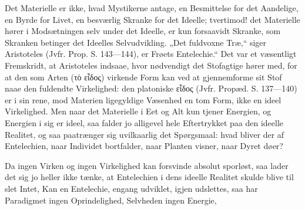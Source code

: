 \documentclass[12pt,a4paper]{book}
\begin{document}
Det Materielle er ikke, hvad Mystikerne antage, en Besmittelse for det
Aandelige, en Byrde for Livet, en besværlig Skranke for det Ideelle;
tvertimod! det Materielle hører i Modsætningen selv under det Ideelle, er
kun forsaavidt Skranke, som Skranken betinger det Ideelles Selvudvikling.
„Det fuldvoxne Træ,“ siger Aristoteles (Jvfr. Prop. S. 143---144), er
Frøets Entelechie.“
Det var et væsentligt Fremskridt, at Aristoteles indsaae, hvor nødvendigt
det Stofagtige hører med, for at den som Arten (τὸ εἶδος) virkende Form
kan ved at gjennemforme sit Stof naae den fuldendte Virkelighed: den
platoniske εἶδος (Jvfr. Propæd. S. 137---140) er i sin rene, mod Materien
ligegyldige Væsenhed en tom Form, ikke en ideel Virkelighed. Men naar det
Materielle i Eet og Alt kun tjener Energien, og Energien i sig er ideel,
saa falder jo alligevel hele Eftertrykket paa den ideelle Realitet, og saa
paatrænger sig uvilkaarlig det Spørgsmaal: hvad bliver der af Entelechien,
naar Individet bortfalder, naar Planten visner, naar Dyret døer?

Da ingen Virken og ingen Virkelighed kan forsvinde absolut sporløst, saa
lader det sig jo heller ikke tænke, at Entelechien i dens ideelle Realitet
skulde blive til slet Intet,
Kan en Entelechie, engang udviklet, igjen udslettes, saa har Paradigmet
ingen Oprindelighed, Selvheden ingen Energie,
\end{document}
